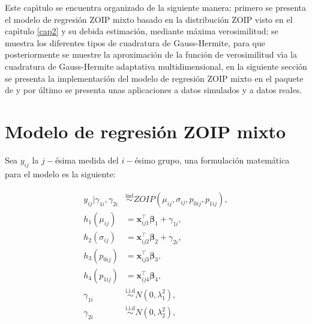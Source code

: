 Este cap\'{\i}tulo se encuentra organizado de la siguiente manera: primero se presenta el modelo de regresi\'{o}n ZOIP mixto basado en la distribuci\'{o}n ZOIP visto en el cap\'{\i}tulo \ref{cap2} y su debida estimaci\'{o}n, mediante m\'{a}xima verosimilitud; se muestra los diferentes tipos de cuadratura de Gauss-Hermite, para que posteriormente se muestre la aproximaci\'{o}n de la funci\'{o}n de verosimilitud v\'{\i}a la cuadratura de Gauss-Hermite adaptativa multidimensional, en la si\-gui\-en\-te secci\'{o}n se presenta la implementaci\'{o}n del modelo de regresi\'{o}n ZOIP mixto en el paquete  de  y por \'{u}ltimo se presenta unas aplicaciones a datos simulados y a datos reales.



\section{Modelo de regresi\'{o}n ZOIP mixto}



Sea $y_{ij}$ la $j-$\'{e}sima medida del $i-$\'{e}simo grupo, una formulaci\'{o}n matem\'{a}tica para el modelo es la siguiente:



\begin{align}
\begin{split}
y_{ij}| \gamma_{1i},\gamma_{2i} & \overset{\text{ind}}{\sim} ZOIP(\mu_{ij},\sigma_{ij},p_{0ij}, p_{1ij}),\\
	h_1(\mu_{ij}) &= \mathbf{x}_{ij1}^{\top} \boldsymbol{\beta}_1+ \gamma_{1i},\\
	h_2(\sigma_{ij}) &= \mathbf{x}_{ij2}^{\top} \boldsymbol{\beta}_2+ \gamma_{2i},\\
	h_3(p_{0ij}) &= \mathbf{x}_{ij3}^{\top} \boldsymbol{\beta}_3,\\
	h_4(p_{1ij}) &= \mathbf{x}_{ij4}^{\top} \boldsymbol{\beta}_4,\\
	\gamma_{1i} & \overset{\text{i.i.d}}{\sim}  N(0,\lambda_1^2),\\
	\gamma_{2i} & \overset{\text{i.i.d}}{\sim}  N(0,\lambda_2^2),
\end{split}
\label{Mod_pmix}
\end{align}

